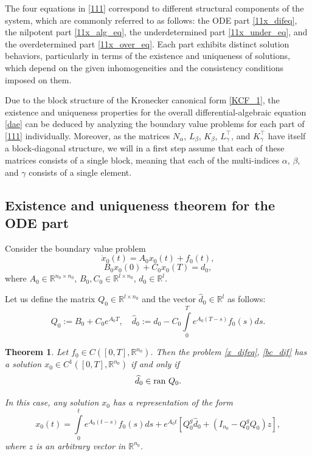 \documentclass[preprint,12pt]{elsarticle}
\numberwithin{equation}{section}
\newtheorem{theorem}{Theorem}[section]
\theoremstyle{definition}
\begin{document}
The four equations in \eqref{111} correspond to different structural components of the system, which are commonly referred to as follows: the ODE part \eqref{11x_difeq},  the nilpotent part \eqref{11x_alg_eq}, the underdetermined part \eqref{11x_under_eq}, and
the overdetermined part \eqref{11x_over_eq}. Each part exhibits distinct solution behaviors, particularly in terms of the existence and uniqueness of solutions, which depend on the given inhomogeneities and the consistency conditions imposed on them.

Due to the block structure of the Kronecker canonical form \eqref{KCF_1},
the existence and uniqueness properties for the overall differential-algebraic equation \eqref{dae} can be deduced by analyzing the boundary value problems for each part of \eqref{111} individually.
Moreover, as the matrices $N_{\alpha}$, $L_{\beta}$, $K_{\beta}$, $L_{\gamma}^\top$, and $K_{\gamma}^\top$ have itself a block-diagonal structure, we will in a first step assume that each of these matrices consists of a single block, meaning that each of the multi-indices $\alpha$, $\beta$, and $\gamma$ consists of a single element.

\subsection{Existence and uniqueness theorem for the ODE part}
Consider the boundary value problem
\begin{equation}\label{x_difeq}\dot{x}_0(t)=A_0x_0(t)+f_0(t), \end{equation}
   \begin{equation}\label{bc_dif}
    B_0x_0(0)+C_0x_0(T)=d_0,\end{equation}
    where $A_0\in \mathbb{R}^{n_0\times n_0}$, $B_0, C_0\in\mathbb{R}^{l\times n_0}$, $d_0\in\mathbb{R}^l$.

    Let us define the matrix $Q_0\in\mathbb{R}^{l\times n_0}$ and the vector $\widehat{d}_0\in\mathbb{R}^l$ as follows:
    \begin{equation}\label{Q_0&d_0_hat}
        Q_0:=B_0+C_0 e^{A_0T}, \quad \widehat{d}_0:=d_0-C_0\int\limits_0^T e^{A_0(T-s)}f_0(s)ds.
    \end{equation}

\begin{theorem}\label{th_ODE_part}
   Let $f_0\in C([0,T],\mathbb{R}^{n_0})$. Then the
    problem \eqref{x_difeq}, \eqref{bc_dif}
has a solution $x_0\in C^1([0,T],\mathbb{R}^{n_0})$ if and only if \begin{equation}\label{d_0_orth}
    \widehat{d}_0\in \textnormal{ran}~ Q_0.
    \end{equation}

 In this case, any solution $x_0$ has a representation of the form
\begin{equation}\label{sol_x0_gen}
    x_0(t)=\int\limits_0^t e^{A_0(t-s)}f_0(s)ds+e^{A_0t}\left[Q_0^g\widehat{d}_0+(I_{n_0}-Q_0^g Q_0)z\right],
\end{equation} where  $z$ is an arbitrary vector in $\mathbb{R}^{n_0}$.
\end{theorem}
\end{document}
